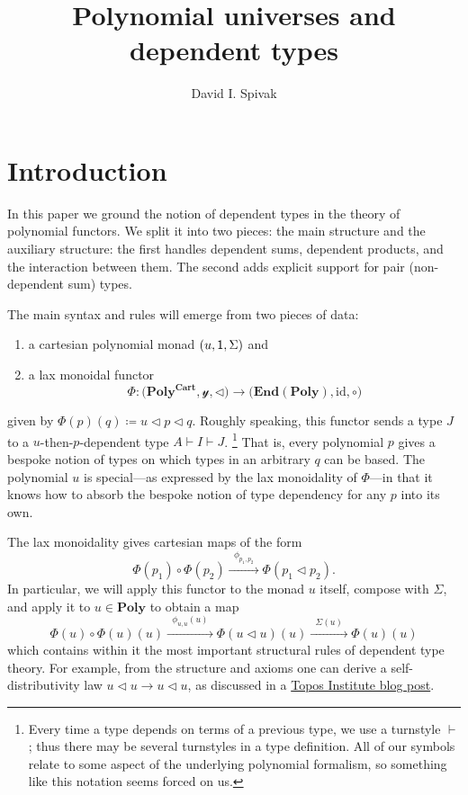 \documentclass[11pt, one side, article]{memoir}
\theoremstyle{definition}
\theoremstyle{plain}
\newcommand{\Cat}[1]{\mathbf{#1}}%
\newcommand{\id}{\mathrm{id}}
\newcommand{\too}{\longrightarrow}
\newcommand{\Too}[1]{\xrightarrow{\;\;#1\;\;}}
\newcommand{\en}{\Cat{End}}
\newcommand{\yon}{\mathcal{y}}
\newcommand{\poly}{\Cat{Poly}}
\newcommand{\polycart}{\poly^{\Cat{Cart}}}
\newcommand{\0}{\textsf{0}}
\newcommand{\1}{\tn{\textsf{1}}}
\newcommand{\tri}{\mathbin{\triangleleft}}
\begin{document}
\title{Polynomial universes and dependent types}

\author{David I. Spivak}

\date{\vspace{-.2in}}

\maketitle

\begin{abstract}
\end{abstract}


\chapter{Introduction}

In this paper we ground the notion of dependent types in the theory of polynomial functors. We split it into two pieces: the main structure and the auxiliary structure: the first handles dependent sums, dependent products, and the interaction between them. The second adds explicit support for pair (non-dependent sum) types. 

The main syntax and rules will emerge from two pieces of data:
\begin{enumerate}
	\item a cartesian polynomial monad $(u,\1,\Sigma)$ and
	\item a lax monoidal functor 
\[
	\Phi\colon\Big(\polycart,\yon,\tri\Big)\too\Big(\en(\poly),\id,\circ\Big)
\]
\end{enumerate}
given by $\Phi(p)(q)\coloneqq u\tri p\tri q$. Roughly speaking, this functor sends a type $J$ to a $u$-then-$p$-dependent type $A\vdash I\vdash J$.%
\footnote{Every time a type depends on terms of a previous type, we use a turnstyle $\vdash$; thus there may be several turnstyles in a type definition. All of our symbols relate to some aspect of the underlying polynomial formalism, so something like this notation seems forced on us.
}
 That is, every polynomial $p$ gives a bespoke notion of types on which types in an arbitrary $q$ can be based. The polynomial $u$ is special---as expressed by the lax monoidality of $\Phi$---in that it knows how to absorb the bespoke notion of type dependency for any $p$ into its own. 

The lax monoidality gives cartesian maps of the form 
\[
\Phi(p_1)\circ\Phi(p_2)
\Too{\phi_{p_1,p_2}}
\Phi(p_1\tri p_2).
\]
In particular, we will apply this functor to the monad $u$ itself, compose with $\Sigma$, and apply it to $u\in\poly$ to obtain a map
\begin{equation}\label{eqn.main}
  \Phi(u)\circ\Phi(u)(u)
  \Too{\phi_{u,u}(u)}
  \Phi(u\tri u)(u)
  \Too{\Sigma(u)}
  \Phi(u)(u)
\end{equation}
which contains within it the most important structural rules of dependent type theory. For example, from the structure and axioms one can derive a self-distributivity law $u\tri u\to u\tri u$, as discussed in a \href{https://topos.site/blog/2021/07/jump-monads-from-conjugation-to-dependent-types/}{Topos Institute blog post}.
\end{document}
